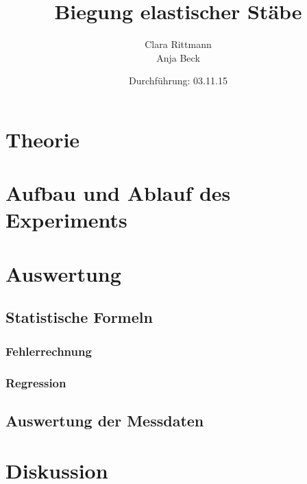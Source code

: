 \documentclass[a4,12pt]{article}
\title{Biegung elastischer Stäbe}
\author{Clara Rittmann \\ Anja Beck}
\date{Durchführung: 03.11.15}
\begin{document}
	\maketitle
	\date{}
\newpage
	\tableofcontents
\newpage

	\section{Theorie}
	
\newpage

	\section{Aufbau und Ablauf des Experiments}
	
\newpage

	\section{Auswertung}
	\subsection{Statistische Formeln}
	\subsubsection{Fehlerrechnung}
	
	\subsubsection{Regression}
	\label{sec:regression}
	
	\subsection{Auswertung der Messdaten}
	
\newpage
	\section{Diskussion}
	
\end{document}
